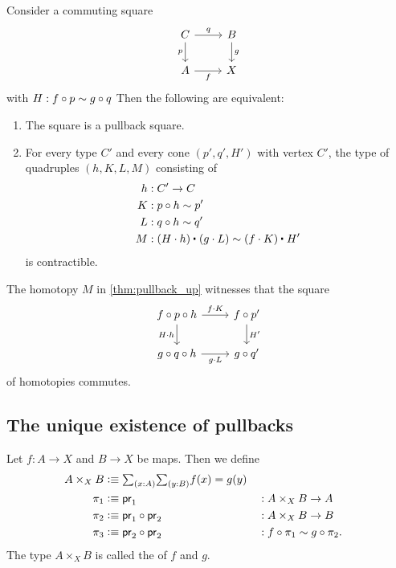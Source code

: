 \begin{thm}\label{thm:pullback_up}
Consider a commuting square
\begin{equation*}
\begin{tikzcd}
C \arrow[r,"q"] \arrow[d,swap,"p"] & B \arrow[d,"g"] \\
A \arrow[r,swap,"f"] & X
\end{tikzcd}
\end{equation*}
with $H:f\circ p\sim g\circ q$
Then the following are equivalent:
\begin{enumerate}
\item The square is a pullback square.
\item For every type $C'$ and every cone $(p',q',H')$ with vertex $C'$, the type of quadruples $(h,K,L,M)$ consisting of
\begin{align*}
h & : C'\to C \\
K & : p\circ h \htpy p' \\
L & : q\circ h \htpy q' \\
M & : \ct{(H\cdot h)}{(g\cdot L)} \htpy \ct{(f\cdot K)}{H'}
\end{align*}
is contractible.
\end{enumerate}
\end{thm}

\begin{rmk}
The homotopy $M$ in \cref{thm:pullback_up} witnesses that the square
\begin{equation*}
\begin{tikzcd}
f\circ p\circ h \arrow[r,"f\cdot K"] \arrow[d,swap,"H\cdot h"] & f\circ p' \arrow[d,"{H'}"] \\
g\circ q\circ h \arrow[r,swap,"g\cdot L"] & g\circ q'
\end{tikzcd}
\end{equation*}
of homotopies commutes.
\end{rmk}

\subsection{The unique existence of pullbacks}

\begin{defn}
Let $f:A\to X$ and $B\to X$ be maps. Then we define
\begin{align*}
A\times_X B & \defeq \sm{x:A}{y:B}f(x)=g(y) \\
\pi_1 & \defeq \proj 1 & & : A\times_X B\to A \\
\pi_2 & \defeq \proj 1\circ\proj 2 & & : A\times_X B\to B\\
\pi_3 & \defeq \proj 2\circ\proj 2 & & : f\circ \pi_1 \htpy g\circ\pi_2.
\end{align*}
The type $A\times_X B$ is called the  of $f$ and $g$.
\end{defn}

